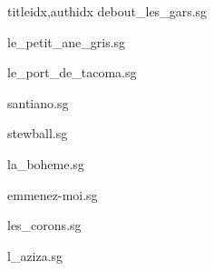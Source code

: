 \documentclass[
    ]{article}
\begin{document}
\begin{songs}{titleidx,authidx}
{debout_les_gars.sg}


{le_petit_ane_gris.sg}


{le_port_de_tacoma.sg}


{santiano.sg}


{stewball.sg}


{la_boheme.sg}


{emmenez-moi.sg}


{les_corons.sg}


{l_aziza.sg}



\end{songs}
\end{document}
